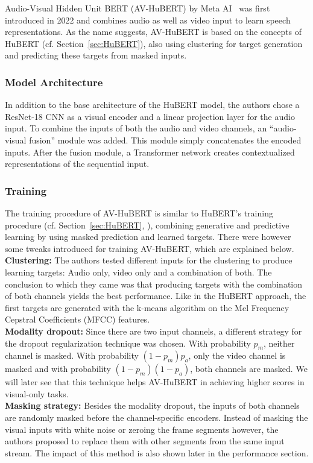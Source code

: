 Audio-Visual Hidden Unit BERT (AV-HuBERT) by Meta AI~\cite{AV_HuBERT} was first introduced in 2022 and combines audio as well as video input to learn speech representations. As the name suggests, AV-HuBERT is based on the concepts of HuBERT (cf. Section~\ref{sec:HuBERT}), also using clustering for target generation and predicting these targets from masked inputs.
\subsubsection{Model Architecture}
In addition to the base architecture of the HuBERT model, the authors chose a ResNet-18 CNN as a visual encoder and a linear projection layer for the audio input. To combine the inputs of both the audio and video channels, an ``audio-visual fusion'' module was added. This module simply concatenates the encoded inputs. After the fusion module, a Transformer network creates contextualized representations of the sequential input.
\subsubsection{Training}\label{sec:av-hubert-training}
The training procedure of AV-HuBERT is similar to HuBERT's training procedure (cf. Section~\ref{sec:HuBERT}, \cite{hubert}), combining generative and predictive learning by using masked prediction and learned targets. There were however some tweaks introduced for training AV-HuBERT, which are explained below.\\
\textbf{Clustering:} The authors tested different inputs for the clustering to produce learning targets: Audio only, video only and a combination of both. The conclusion to which they came was that producing targets with the combination of both channels yields the best performance. Like in the HuBERT approach, the first targets are generated with the k-means algorithm on the Mel Frequency Cepstral Coefficients (MFCC) features.\\
\textbf{Modality dropout:} Since there are two input channels, a different strategy for the dropout regularization technique was chosen. With probability $p_m$, neither channel is masked. With probability $(1-p_m)p_a$, only the video channel is masked and with probability $(1-p_m)(1-p_a)$, both channels are masked. We will later see that this technique helps AV-HuBERT in achieving higher scores in visual-only tasks.\\
\textbf{Masking strategy:} Besides the modality dropout, the inputs of both channels are randomly masked before the channel-specific encoders. Instead of masking the visual inputs with white noise or zeroing the frame segments however, the authors proposed to replace them with other segments from the same input stream. The impact of this method is also shown later in the performance section.
